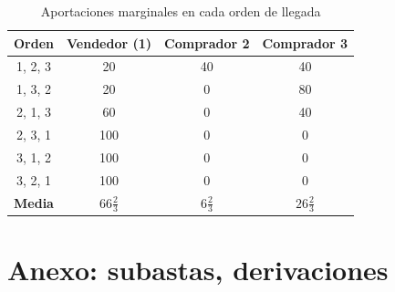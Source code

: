 \documentclass[11pt]{article}
\begin{document}
\begin{table}[H]
\centering
\caption{Aportaciones marginales en cada orden de llegada}\label{tab:shapley}
\begin{tabular}{cccc}
\toprule
\rowcolor{tceeazulpalido} \textbf{Orden} & \textbf{Vendedor (1)} & \textbf{Comprador 2} & \textbf{Comprador 3}\\
\midrule
1, 2, 3 & 20 & 40 & 40\\
1, 3, 2 & 20 & 0 & 80\\
2, 1, 3 & 60 & 0 & 40\\
2, 3, 1 & 100 & 0 & 0\\
3, 1, 2 & 100 & 0 & 0\\
3, 2, 1 & 100 & 0 & 0\\
\midrule
\rowcolor{tceesalvia} \textbf{Media} & $66\tfrac23$ & $6\tfrac23$ & $26\tfrac23$\\
\bottomrule
\end{tabular}
\end{table}

\section{Anexo: subastas, derivaciones}\label{anexo:subastas}
\end{document}
